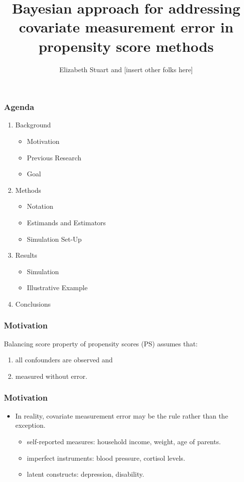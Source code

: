 \documentclass{beamer}
\title{Bayesian approach for addressing covariate measurement error in propensity score methods}
\author{Elizabeth Stuart and [insert other folks here]}
\begin{document}
\begin{frame}
\frametitle{Agenda}
\begin{enumerate}
\item Background
\begin{itemize}
\item Motivation
\item Previous Research
\item Goal
\end{itemize}
\item Methods
\begin{itemize}
\item Notation
	\item Estimands and Estimators
	\item Simulation Set-Up
\end{itemize}
\item Results
\begin{itemize}
	\item Simulation
	\item Illustrative Example
\end{itemize}
\item Conclusions
\end{enumerate}
\end{frame}

  \begin{frame}
\frametitle{Motivation}

Balancing score property of propensity scores (PS) assumes that:
\begin{enumerate}
\item all confounders are observed and 
\item measured without error.
\end{enumerate}
\end{frame}

\begin{frame}
\frametitle{ Motivation}

\begin{itemize}
\item In reality, covariate measurement error may be the rule rather than the exception. 
\begin{itemize}
	\item self-reported measures: household income, weight, age of parents.
	\item imperfect instruments: blood pressure, cortisol levels.
	\item latent constructs: depression, disability.
\end{itemize}
\end{itemize}

 
\end{frame}
\end{document}
